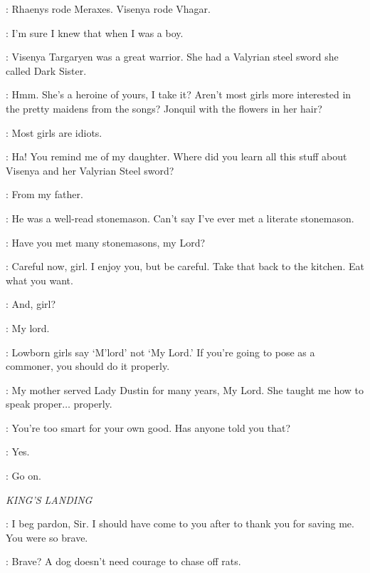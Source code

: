\ARYA: Rhaenys rode Meraxes. Visenya rode Vhagar.

\TYWIN: I'm sure I knew that when I was a boy.

\ARYA: Visenya Targaryen was a great warrior. She had a Valyrian steel sword she called Dark Sister.

\TYWIN: Hmm. She's a heroine of yours, I take it? Aren't most girls more interested in the pretty maidens from the songs? Jonquil with the flowers in her hair?

\ARYA: Most girls are idiots.

\TYWIN: Ha! You remind me of my daughter. Where did you learn all this stuff about Visenya and her Valyrian Steel sword?

\ARYA: From my father.

\TYWIN: He was a well-read stonemason. Can't say I've ever met a literate stonemason.

\ARYA: Have you met many stonemasons, my Lord?

\TYWIN: Careful now, girl. I enjoy you, but be careful. Take that back to the kitchen. Eat what you want.


\TYWIN: And, girl?


\ARYA: My lord.


\TYWIN: Lowborn girls say `M'lord' not `My Lord.' If you're going to pose as a commoner, you should do it properly.

\ARYA: My mother served Lady Dustin for many years, My Lord. She taught me how to speak proper$\ldots$ properly.

\TYWIN: You're too smart for your own good. Has anyone told you that?

\ARYA: Yes.

\TYWIN: Go on.



\scene

\textit{KING'S LANDING}


\SANSA: I beg pardon, Sir. I should have come to you after to thank you for saving me. You were so brave.

\HOUND: Brave? A dog doesn't need courage to chase off rats.

